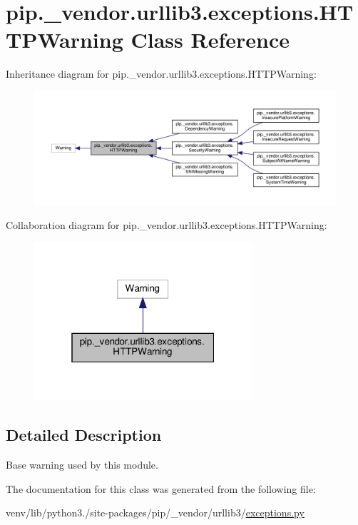 \hypertarget{classpip_1_1__vendor_1_1urllib3_1_1exceptions_1_1HTTPWarning}{}\section{pip.\+\_\+vendor.\+urllib3.\+exceptions.\+H\+T\+T\+P\+Warning Class Reference}
\label{classpip_1_1__vendor_1_1urllib3_1_1exceptions_1_1HTTPWarning}


Inheritance diagram for pip.\+\_\+vendor.\+urllib3.\+exceptions.\+H\+T\+T\+P\+Warning\+:
\nopagebreak
\begin{figure}[H]
\begin{center}
\leavevmode
\includegraphics[width=350pt]{classpip_1_1__vendor_1_1urllib3_1_1exceptions_1_1HTTPWarning__inherit__graph}
\end{center}
\end{figure}


Collaboration diagram for pip.\+\_\+vendor.\+urllib3.\+exceptions.\+H\+T\+T\+P\+Warning\+:
\nopagebreak
\begin{figure}[H]
\begin{center}
\leavevmode
\includegraphics[width=229pt]{classpip_1_1__vendor_1_1urllib3_1_1exceptions_1_1HTTPWarning__coll__graph}
\end{center}
\end{figure}


\subsection{Detailed Description}
\begin{DoxyVerb}Base warning used by this module.\end{DoxyVerb}
 

The documentation for this class was generated from the following file\+:\begin{DoxyCompactItemize}
\item 
venv/lib/python3./site-\/packages/pip/\+\_\+vendor/urllib3/\hyperlink{pip_2__vendor_2urllib3_2exceptions_8py}{exceptions.\+py}\end{DoxyCompactItemize}
